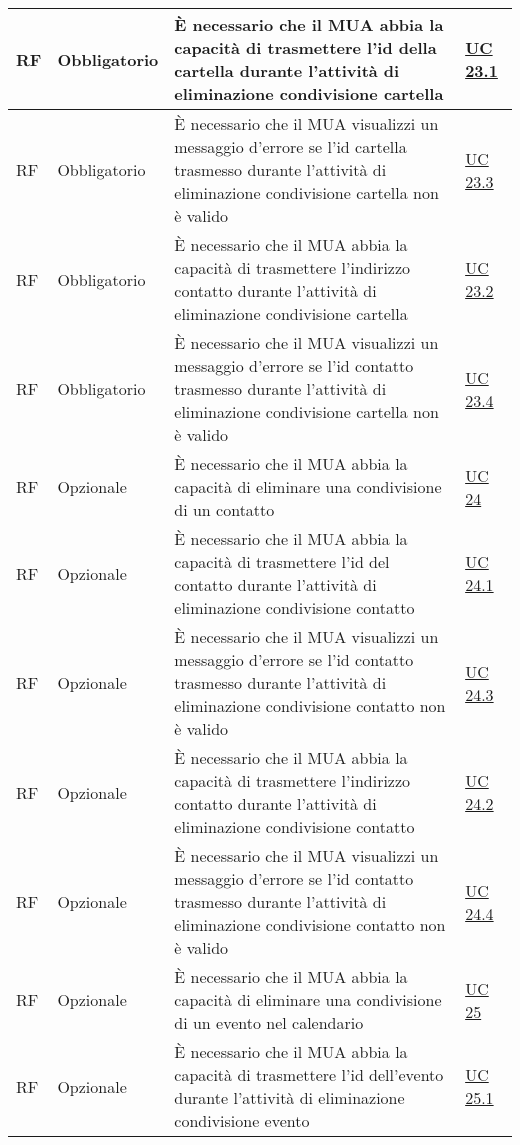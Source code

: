 \begin{longtable}{*{1}{>{\centering\arraybackslash}p{1.5cm}}*{1}{>{\centering\arraybackslash}p{2.5cm}}p{6cm}*{1}{>{\centering\arraybackslash}p{3cm}}}
    \\\hline
    RF & Obbligatorio & È necessario che il MUA abbia la capacità di trasmettere l'id della cartella durante l'attività di eliminazione condivisione cartella & \hyperref[sec:UC23.1]{UC 23.1}
    \\\hline
    RF & Obbligatorio & È necessario che il MUA visualizzi un messaggio d'errore se l'id cartella trasmesso durante l'attività di eliminazione condivisione cartella non è valido & \hyperref[sec:UC23.3]{UC 23.3}
    \\\hline
    RF & Obbligatorio & È necessario che il MUA abbia la capacità di trasmettere l'indirizzo contatto durante l'attività di eliminazione condivisione cartella & \hyperref[sec:UC23.2]{UC 23.2}
    \\\hline
    RF & Obbligatorio & È necessario che il MUA visualizzi un messaggio d'errore se l'id contatto trasmesso durante l'attività di eliminazione condivisione cartella non è valido & \hyperref[sec:UC23.4]{UC 23.4}
    \\\hline
    RF & Opzionale & È necessario che il MUA abbia la capacità di eliminare una condivisione di un contatto & \hyperref[sec:UC24]{UC 24}
    \\\hline
    RF & Opzionale & È necessario che il MUA abbia la capacità di trasmettere l'id del contatto durante l'attività di eliminazione condivisione contatto & \hyperref[sec:UC24.1]{UC 24.1}
    \\\hline
    RF & Opzionale & È necessario che il MUA visualizzi un messaggio d'errore se l'id contatto trasmesso durante l'attività di eliminazione condivisione contatto non è valido & \hyperref[sec:UC24.3]{UC 24.3}
    \\\hline
    RF & Opzionale & È necessario che il MUA abbia la capacità di trasmettere l'indirizzo contatto durante l'attività di eliminazione condivisione contatto & \hyperref[sec:UC24.2]{UC 24.2}
    \\\hline
    RF & Opzionale & È necessario che il MUA visualizzi un messaggio d'errore se l'id contatto trasmesso durante l'attività di eliminazione condivisione contatto non è valido & \hyperref[sec:UC24.4]{UC 24.4}
    \\\hline
    RF & Opzionale & È necessario che il MUA abbia la capacità di eliminare una condivisione di un evento nel calendario & \hyperref[sec:UC25]{UC 25}
    \\\hline
    RF & Opzionale & È necessario che il MUA abbia la capacità di trasmettere l'id dell'evento durante l'attività di eliminazione condivisione evento & \hyperref[sec:UC25.1]{UC 25.1}

\end{longtable}
